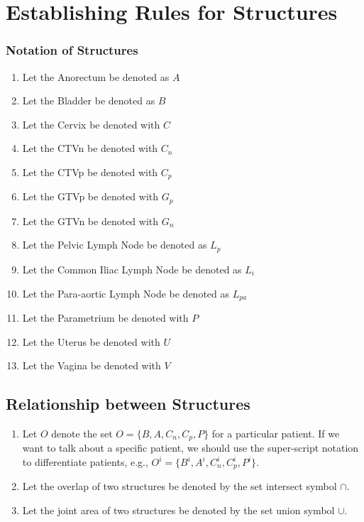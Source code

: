 \documentclass[11pt,twoside]{report}
\begin{document}
\section{Establishing Rules for Structures}\label{sec:data-delineation-rules}

\begin{minipage}{0.5\textwidth}
  \subsubsection{Notation of Structures}
  \begin{enumerate}
    \item Let the Anorectum be denoted as $A$
    \item Let the Bladder be denoted as $B$
    \item Let the Cervix be denoted with $C$
    \item Let the CTVn be denoted with $C_n$
    \item Let the CTVp be denoted with $C_p$
    \item Let the GTVp be denoted with $G_p$
    \item Let the GTVn be denoted with $G_n$
    \item Let the Pelvic Lymph Node be denoted as $L_p$
    \item Let the Common Iliac Lymph Node be denoted as $L_i$
    \item Let the Para-aortic Lymph Node be denoted as $L_{pa}$
  \end{enumerate}
\end{minipage}%
\begin{minipage}{0.5\textwidth}

\begin{enumerate}
  \setcounter{enumi}{10}
  \item Let the Parametrium be denoted with $P$
  \item Let the Uterus be denoted with $U$
  \item Let the Vagina be denoted with $V$
\end{enumerate}

\subsection{Relationship between Structures}

\begin{enumerate}
  \item Let $O$ denote the set $O = \{B, A, C_n, C_p, P \}$ for a particular patient. If we want to talk about a specific patient, we should use the super-script notation to differentiate patients, e.g., $O^i = \{B^i, A^i, C_n^i, C_p^i, P^i\}$.
  \item Let the overlap of two structures be denoted by the set intersect symbol $\cap$.
  \item Let the joint area of two structures be denoted by the set union symbol $\cup$.
\end{enumerate}


\end{minipage}
\end{document}
